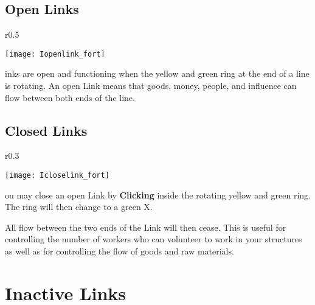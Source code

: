 \subsection{Open Links}


\begin{wrapfigure}{r}{0.5\textwidth}
	\vspace{-20pt}
	\begin{center}
		\texttt{[image: Iopenlink\_fort]} %
	\end{center}
	\vspace{-20pt}
\end{wrapfigure}

inks are open and functioning when the yellow and green ring at the end of a line is rotating. An open Link means that goods, money, people, and influence can flow between both ends of the line.

\subsection{Closed Links}


\begin{wrapfigure}{r}{0.3\textwidth}
	\vspace{-20pt}
	\begin{center}
		\texttt{[image: Icloselink\_fort]} %
	\end{center}
	\vspace{-10pt}
\end{wrapfigure}


ou may close an open Link by \textbf{Clicking} inside the rotating yellow and green ring. The ring will then change to a green X.

All flow between the two ends of the Link will then cease. This is useful for controlling the number of workers who can volunteer to work in your structures as well as for controlling the flow of goods and raw materials.

\section{Inactive Links}


